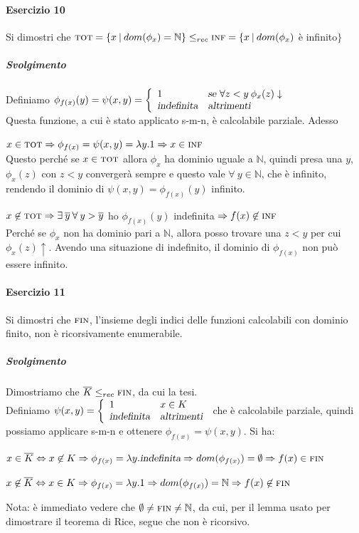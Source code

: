 \documentclass[10pt]{book}
\begin{document}
\paragraph{Esercizio 10} Si dimostri che $\textsc{tot} = \{x\:|\:dom(\phi_x) = \mathbb{N}\}\leq_{rec}\textsc{inf} = \{x\:|\:dom(\phi_x)$ è infinito$\}$
\subparagraph{Svolgimento} Definiamo $\phi_{f(x)}(y) = \psi(x,y) = \left\{\begin{array}{l l}
1&\textsl{se }\forall z < y\:\phi_x(z)\downarrow\\
\textsl{indefinita}&\textsl{altrimenti}
\end{array}\right.$\\
Questa funzione, a cui è stato applicato s-m-n, è calcolabile parziale. Adesso
\begin{list}{}{}
	\item $x\in\textsc{tot} \Rightarrow \phi_{f(x)} = \psi(x,y) = \lambda y.1 \Rightarrow x\in\textsc{inf}$\\
	Questo perché se $x\in\textsc{tot}$ allora $\phi_x$ ha dominio uguale a $\mathbb{N}$, quindi presa una $y$, $\phi_x(z)$ con $z < y$ convergerà sempre e questo vale $\forall\:y\in \mathbb{N}$, che è infinito, rendendo il dominio di $\psi(x,y) = \phi_{f(x)}(y)$ infinito.
	\item $x\not\in\textsc{tot} \Rightarrow\exists\:\overline{y}\:\forall\:y>\overline{y}$ ho $\phi_{f(x)}(y)$ indefinita $\Rightarrow f(x) \not\in \textsc{inf}$\\
	Perché se $\phi_x$ non ha dominio pari a $\mathbb{N}$, allora posso trovare una $z < y$ per cui $\phi_x(z)\uparrow$. Avendo una situazione di indefinito, il dominio di $\phi_{f(x)}$ non può essere infinito.
\end{list}
\paragraph{Esercizio 11} Si dimostri che $\textsc{fin}$, l'insieme degli indici delle funzioni calcolabili con dominio finito, non è ricorsivamente enumerabile.
\subparagraph{Svolgimento} Dimostriamo che $\overline{K}\leq_{rec}\textsc{fin}$, da cui la tesi.\\
Definiamo $\psi(x,y)=\left\{\begin{array}{l l}
1&x\in K\\
\textsl{indefinita}&\textsl{altrimenti}
\end{array}\right.$ che è calcolabile parziale, quindi possiamo applicare s-m-n e ottenere $\phi_{f(x)} = \psi(x,y)$. Si ha:
\begin{list}{}{}
	\item $x\in\overline{K} \Leftrightarrow x \not\in K \Rightarrow \phi_{f(x)} = \lambda y.\textsl{indefinita} \Rightarrow dom(\phi_{f(x)}) = \emptyset \Rightarrow f(x) \in \textsc{fin}$
	\item $x\not\in\overline{K} \Leftrightarrow x \in K \Rightarrow \phi_{f(x)} = \lambda y.1 \Rightarrow dom(\phi_{f(x)}) = \mathbb{N} \Rightarrow f(x) \not\in \textsc{fin}$
\end{list}
Nota: è immediato vedere che $\emptyset\neq\textsc{fin}\neq \mathbb{N}$, da cui, per il lemma usato  per dimostrare il teorema di Rice, segue che non è ricorsivo.
\pagebreak
\end{document}
